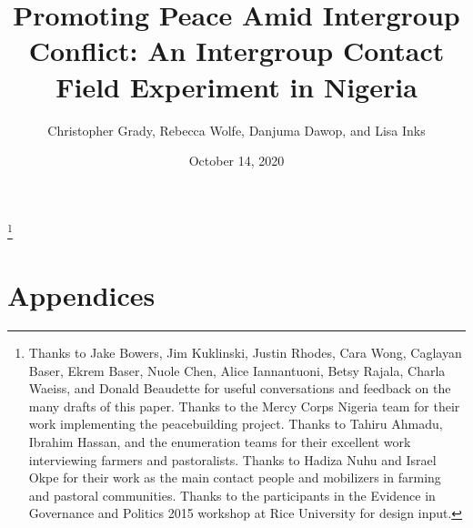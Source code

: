 \documentclass[11pt]{article}
\title{Promoting Peace Amid Intergroup Conflict: An Intergroup Contact
Field Experiment in Nigeria}
\author{\parbox{.7\linewidth}{\centering
Christopher Grady, Rebecca Wolfe, Danjuma Dawop, and Lisa Inks
}
}
\date{October 14, 2020}
\begin{document}
\VerbatimFootnotes

%
%
%
%
%
%
%
%
%
%

\newlength{\cslhangindent}
\setlength{\cslhangindent}{1.5em}
\newenvironment{cslreferences}%
  {\setlength{\parindent}{0pt}%
  \everypar{\setlength{\hangindent}{\cslhangindent}}\ignorespaces}%
  {\par}

\maketitle


\newcommand\blfootnote[1]{%
  \begingroup
  \renewcommand\thefootnote{}\footnote{#1}%
  \addtocounter{footnote}{-1}%
  \endgroup
}
\singlespacing\blfootnote{Thanks to Jake Bowers, Jim Kuklinski, Justin
Rhodes, Cara Wong, Caglayan Baser, Ekrem Baser, Nuole Chen, Alice
Iannantuoni, Betsy Rajala, Charla Waeiss, and Donald Beaudette for
useful conversations and feedback on the many drafts of this paper.
Thanks to the Mercy Corps Nigeria team for their work implementing the
peacebuilding project. Thanks to Tahiru Ahmadu, Ibrahim Hassan, and the
enumeration teams for their excellent work interviewing farmers and
pastoralists. Thanks to Hadiza Nuhu and Israel Okpe for their work as
the main contact people and mobilizers in farming and pastoral
communities. Thanks to the participants in the Evidence in Governance
and Politics 2015 workshop at Rice University for design input.}

\hypertarget{appendices}{%
\section{Appendices}\label{appendices}}
\end{document}
